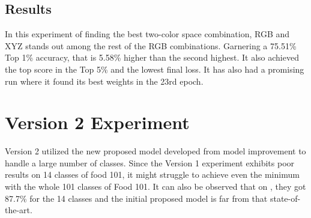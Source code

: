 \subsection{Results}
In this experiment of finding the best two-color space combination, RGB and XYZ stands out among the rest of the RGB combinations. Garnering a 75.51\% Top 1\% accuracy, that is 5.58\% higher than the second highest. It also achieved the top score in the Top 5\% and the lowest final loss. It has also had a promising run where it found its best weights in the 23rd epoch.
\begin{table}[h]
  \centering
  \caption{Color Space combination Results}
  \label{tab:cscr}
\end{table}

\section{Version 2 Experiment}
Version 2 utilized the new proposed model developed from model improvement to handle a large number of classes. Since the Version 1 experiment exhibits poor results on 14 classes of food 101, it might struggle to achieve even the minimum with the whole 101 classes of Food 101. It can also be observed that on \cite{kaur-2023}, they got 87.7\% for the 14 classes and the initial proposed model is far from that state-of-the-art. 

